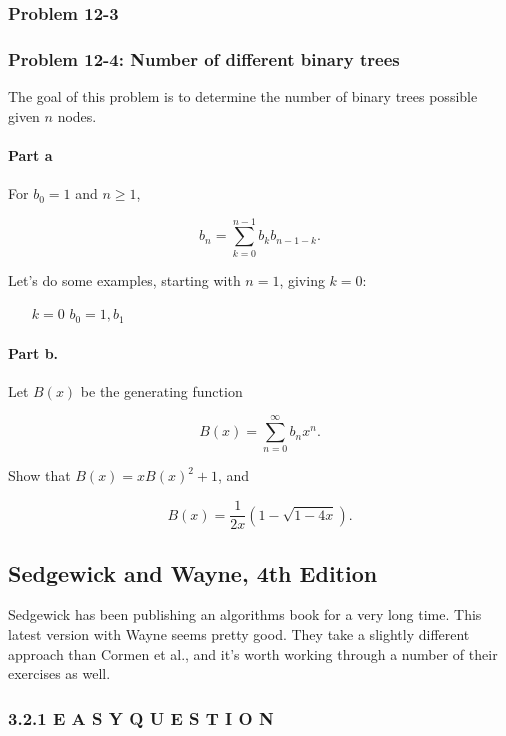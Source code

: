 \documentclass{article}
\begin{document}
\subsubsection{Problem 12-3}

\subsubsection{Problem 12-4: Number of different binary trees}

The goal of this problem is to determine the number of binary
trees possible given $n$ nodes.

\paragraph{Part a} For $b_0 = 1$ and $n \geq 1$,

\[
b_n = \sum_{k=0}^{n-1} b_kb_{n-1-k}.
\]

Let's do some examples, starting with $n = 1$, giving $k = 0$:

\begin{itemize}
\item [$k=0$] $b_0 = 1, b_1$
\end{itemize}

\paragraph{Part b.} Let $B(x)$ be the generating function

\begin{equation}
B(x) = \sum_{n=0}^{\infty}b_nx^n.
\end{equation}

Show that $B(x) = xB(x)^2 + 1$, and

\begin{equation}
B(x) = \frac{1}{2x}(1-\sqrt{1-4x}).
\end{equation}


\subsection{Sedgewick and Wayne, 4th Edition}

Sedgewick has been publishing an algorithms book for a very long time.
This latest version with Wayne seems pretty good. They take a slightly
different approach than Cormen et al., and it's worth working through
a number of their exercises as well.

\subsubsection{3.2.1 E A S Y Q U E S T I O N}
\end{document}
